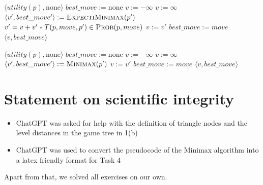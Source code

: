 \documentclass{article} %
\begin{document}
\section{}
\begin{algorithm}
\caption{ExpectiMinimax}
\begin{algorithmic}[1]
        \State \Return $\langle utility(p), \text{none} \rangle$
    \EndIf
    \State $best\_move := \text{none}$
        \State $v := -\infty$
    \Else
        \State $v := \infty$
    \EndIf
        \State $\langle v', best\_move' \rangle := \Call{ExpectiMinimax}{p'}$
        \State $v' = v + v' * T(p,move,p') \in \Call{Prob}{p,move}$
            \State $v := v'$
            \State $best\_move := move$
        \EndIf
    \EndFor
    \State \Return $\langle v, best\_move \rangle$
\EndFunction
\end{algorithmic}
\end{algorithm}



\begin{algorithm}
\caption{Original Minimax from Slides}
\begin{algorithmic}[2]
        \State \Return $\langle utility(p), \text{none} \rangle$
    \EndIf
    \State $best\_move := \text{none}$
        \State $v := -\infty$
    \Else
        \State $v := \infty$
    \EndIf
        \State $\langle v', best\_move' \rangle := \Call{Minimax}{p'}$
            \State $v := v'$
            \State $best\_move := move$
        \EndIf
    \EndFor
    \State \Return $\langle v, best\_move \rangle$
\EndFunction
\end{algorithmic}
\end{algorithm}



\section*{Statement on scientific integrity}
\begin{itemize}
    \item ChatGPT was asked for help with the definition of
    triangle nodes and the level distances in the game tree in 1(b)
    \item ChatGPT was used to convert the pseudocode of the Minimax algorithm into a latex friendly format for Task 4
\end{itemize}
Apart from that, we solved all exercises on our own.
\end{document}
